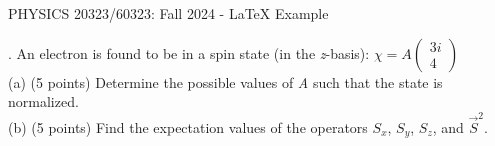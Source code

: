 \documentclass[12pt]{article}
\begin{document}
\def\pos{\medskip\quad}
\def\subpos{\smallskip \qquad}

\begin{center}
{\Large
{PHYSICS  20323/60323: Fall 2024 - LaTeX Example}
}\\
\end{center}
. An electron is found to be in a spin state (in the \textit{z}-basis): $\chi=A \begin{pmatrix}3i \\ 4 \end{pmatrix}$\\

(a) (5 points) Determine the possible values of \textit{A} such that the state is normalized. \\

\indent (b) (5 points) Find the expectation values of the operators {\color{red}\textit{$S_x$}}, {\color{purple}\textit{$S_y$}}, {\color{orange}\textit{$S_z$}}, and \textit{${\Vec{S}}^2$}.\\

 \\
\\
   \\
\end{document}
